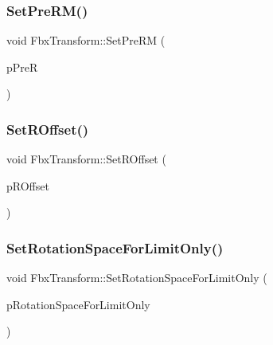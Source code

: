 \mbox{\label{class_fbx_transform_af0c78d72502a10185b169a3d2e338923}} 
\subsubsection{\texorpdfstring{Set\+Pre\+R\+M()}{SetPreRM()}}
{\footnotesize\ttfamily void Fbx\+Transform\+::\+Set\+Pre\+RM (\begin{DoxyParamCaption}\item[{const \hyperlink{class_fbx_vector4}{Fbx\+Vector4} \&}]{p\+PreR }\end{DoxyParamCaption})}

\mbox{\label{class_fbx_transform_a9711194d9ef07112e7281328d0f0f9a8}} 
\subsubsection{\texorpdfstring{Set\+R\+Offset()}{SetROffset()}}
{\footnotesize\ttfamily void Fbx\+Transform\+::\+Set\+R\+Offset (\begin{DoxyParamCaption}\item[{const \hyperlink{class_fbx_vector4}{Fbx\+Vector4} \&}]{p\+R\+Offset }\end{DoxyParamCaption})}

\mbox{\label{class_fbx_transform_a36e9405be837036637bf321b31b7b062}} 
\subsubsection{\texorpdfstring{Set\+Rotation\+Space\+For\+Limit\+Only()}{SetRotationSpaceForLimitOnly()}}
{\footnotesize\ttfamily void Fbx\+Transform\+::\+Set\+Rotation\+Space\+For\+Limit\+Only (\begin{DoxyParamCaption}\item[{bool}]{p\+Rotation\+Space\+For\+Limit\+Only }\end{DoxyParamCaption})}

